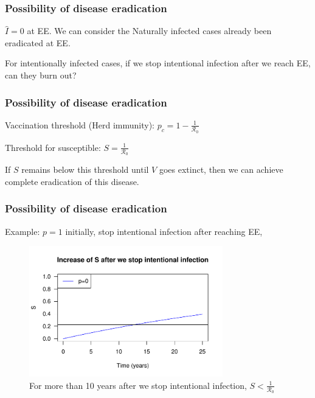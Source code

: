 \documentclass[12pt]{beamer}
\newcommand{\R}{\mathcal{R}}
\begin{document}
\begin{frame}
\frametitle{Possibility of disease eradication}

$\hat{I}=0$ at EE. We can consider the Naturally infected cases already been eradicated at EE.

\pause
For intentionally infected cases, if we stop intentional infection after we reach EE, can they burn out?
\end{frame}
\begin{frame}
\frametitle{Possibility of disease eradication}

Vaccination threshold (Herd immunity): $p_c=1-\frac{1}{\R_0}$

\pause

\begin{center}
Threshold for susceptible: $S=\frac{1}{\R_0}$
\end{center}

\pause
If $S$ remains below this threshold until $V$ goes extinct, then we can achieve complete eradication of this disease.
\end{frame}
\begin{frame}
\frametitle{Possibility of disease eradication}

Example: $p=1$ initially, stop intentional infection after reaching EE, 
\begin{figure}[H]
  \centering
  \includegraphics[width=0.75\textwidth]{Figures/Increase_of_S.pdf}
  \caption{For more than 10 years after we stop intentional infection, $S<\frac{1}{\R_0}$}
\label{figure:S_after_stop}
\end{figure}
\end{frame}
\end{document}
